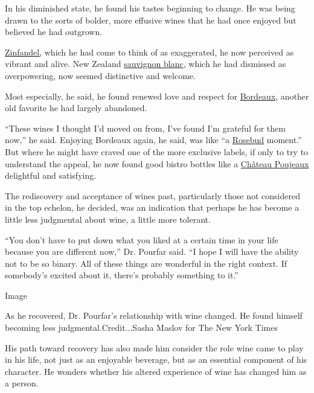 In his diminished state, he found his tastes beginning to change. He was
being drawn to the sorts of bolder, more effusive wines that he had once
enjoyed but believed he had outgrown.

\href{https://www.nytimes3xbfgragh.onion/2014/07/09/dining/your-next-lesson-zinfandel.html}{Zinfandel,}
which he had come to think of as exaggerated, he now perceived as
vibrant and alive. New Zealand
\href{https://www.nytimes3xbfgragh.onion/2017/07/27/dining/wine-school-new-zealand-sauvignon-blanc.html}{sauvignon
blanc}, which he had dismissed as overpowering, now seemed distinctive
and welcome.

Most especially, he said, he found renewed love and respect for
\href{https://www.nytimes3xbfgragh.onion/2016/10/26/dining/wine-review-bordeaux-2011.html}{Bordeaux},
another old favorite he had largely abandoned.

``These wines I thought I'd moved on from, I've found I'm grateful for
them now,'' he said. Enjoying Bordeaux again, he said, was like ``a
\href{https://www.youtube.com/watch?v=O4mQqVqRB7I}{Rosebud} moment.''
But where he might have craved one of the more exclusive labels, if only
to try to understand the appeal, he now found good bistro bottles like a
\href{https://www.thewinecellarinsider.com/bordeaux-wine-producer-profiles/bordeaux/haut-medoc-lesser-appellations/poujeaux/}{Château
Poujeaux} delightful and satisfying.

The rediscovery and acceptance of wines past, particularly those not
considered in the top echelon, he decided, was an indication that
perhaps he has become a little less judgmental about wine, a little more
tolerant.

``You don't have to put down what you liked at a certain time in your
life because you are different now,'' Dr. Pourfar said. ``I hope I will
have the ability not to be so binary. All of these things are wonderful
in the right context. If somebody's excited about it, there's probably
something to it.''

Image

As he recovered, Dr. Pourfar's relationship with wine changed. He found
himself becoming less judgmental.Credit...Sasha Maslov for The New York
Times

His path toward recovery has also made him consider the role wine came
to play in his life, not just as an enjoyable beverage, but as an
essential component of his character. He wonders whether his altered
experience of wine has changed him as a person.

